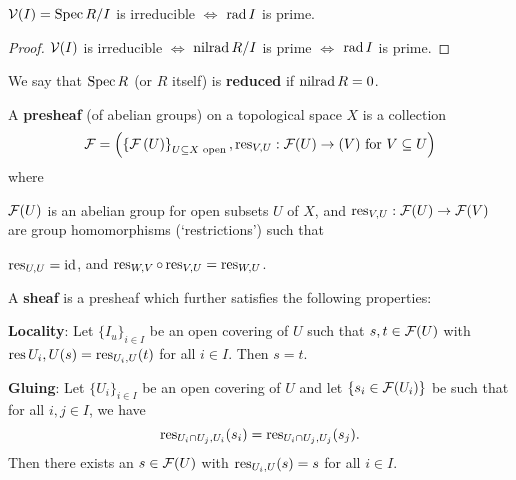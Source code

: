 \begin{cor}[AG.10]
  $\mathcal{V}(I) = \operatorname{Spec} R/I$ is irreducible $\iff$ $\operatorname{rad} I$ is prime.  
\end{cor}

\begin{proof}
  $\mathcal{V}(I)$ is irreducible $\iff$ $\operatorname{nilrad} R/I$ is prime $\iff$ $\operatorname{rad} I$ is prime.
\end{proof}

\begin{defn}
  We say that $\operatorname{Spec} R$ (or $R$ itself) is \textbf{reduced} if $\operatorname{nilrad} R = 0$.
\end{defn}

\begin{defn}[AG.11]
  A \textbf{presheaf} (of abelian groups) on a topological space $X$ is a collection
  \[\mathcal{F} = \left( \left\{ \mathcal{F} \left( U \right) \right\}_{U \subseteq X \text{ open}}, \operatorname{res}_{V,U}: \mathcal{F} (U) \to (V) \text{ for } V \subseteq U \right)\]
  where
  \begin{enum}
    \io $\mathcal{F}(U)$ is an abelian group for open subsets $U$ of $X$, and
    \io $\operatorname{res}_{V,U}: \mathcal{F}(U) \to \mathcal{F}(V)$ are group homomorphisms (`restrictions') such that
    \begin{enum}
      \io $\operatorname{res}_{U,U} = \operatorname{id}$, and
      \io $\operatorname{res}_{W,V} \circ \operatorname{res}_{V,U} = \operatorname{res}_{W,U}$.
    \end{enum}
  \end{enum}
  A \textbf{sheaf} is a presheaf which further satisfies the following properties:
  \begin{enum}
    \io
    \textbf{Locality}: Let $\{I_u\}_{i \in I}$ be an open covering of $U$ such that $s,t \in \mathcal{F}(U)$ with $\operatorname{res}{U_i,U}(s) = \operatorname{res}_{U_i,U}(t)$ for all $i \in I$.
    Then $s=t$.

    \io
    \textbf{Gluing}: Let $\{U_i\}_{i \in I}$ be an open covering of $U$ and let $\{s_i \in \mathcal{F}(U_i)\}$ be such that for all $i,j \in I$, we have
    \[\operatorname{res}_{U_i \cap U_j, U_i}(s_i) = \operatorname{res}_{U_i \cap U_j, U_j}(s_j).\]
    Then there exists an $s \in \mathcal{F}(U)$ with $\operatorname{res}_{U_i,U}(s)=s$ for all $i \in I$.
  \end{enum}
\end{defn}

